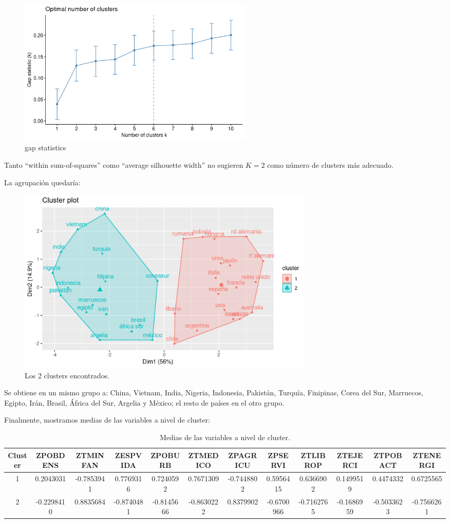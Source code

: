 \documentclass[11pt,a4paper]{article}
\begin{document}
	\begin{figure}[H]
		\centering
		\includegraphics[width=0.55\textwidth]{images/gap}
		\caption{gap statistics}
	\end{figure}
	
	Tanto ``within sum-of-squares'' como ``average silhouette width'' no sugieren $K=2$ como número de clusters más adecuado.
	
	La agrupación quedaría:
	\begin{figure}[H]
		\centering
		\includegraphics[width=0.7\textwidth]{images/2clusters}
		\caption{Los 2 clusters encontrados.}
	\end{figure}
	
	Se obtiene en un mismo grupo a: China, Vietnam, India, Nigeria, Indonesia, Pakistán, Turquía, Finipinas, Corea del Sur, Marruecos, Egipto, Irán, Brasil, África del Sur, Argelia y México; el resto de países en el otro grupo.
	
	Finalmente, mostramos medias de las variables a nivel de cluster:
	
	\begin{table}[H]
	\begin{center}
	\resizebox{17.4cm}{!} {
	\begin{tabular}{|c|c|c|c|c|c|c|c|c|c|c|c|}
	\hline
	  Cluster & ZPOBDENS & ZTMINFAN & ZESPVIDA & ZPOBURB & ZTMEDICO & ZPAGRICU & ZPSERVI & ZTLIBROP & ZTEJERCI  & ZTPOBACT & ZTENERGI\\
	\hline \hline
	1 & 0.2043031 & -0.7853941 & 0.7769316 & 0.7240592 & 0.7671309 & -0.7448802 & 0.5956415 & 0.6366902 & 0.1499519 & 0.4474332 & 0.6725565 \\ \hline
	2 & -0.2298410 & 0.8835684	 & -0.8740481 & -0.8145666	 & -0.8630222	 & 0.8379902	 & -0.6700966 & -0.7162765 & -0.1686959 & -0.5033623 & -0.7566261 \\ \hline
	\end{tabular}
	}
	\caption{Medias de las variables a nivel de cluster.}
	\label{tabla:sencilla}
	\end{center}
	\end{table}
\end{document}

